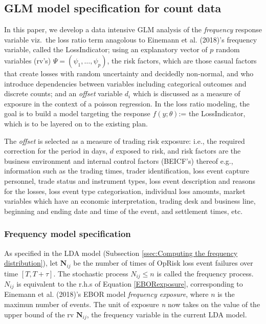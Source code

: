 \documentclass{DissertateUSU}
\begin{document}
\subsection{GLM model specification for count data}
\label{ssec:GLM model specification for count data}

In this paper, we develop a data intensive GLM analysis of the
\emph{frequency} response variable viz.~the loss ratio term anagolous to
Einemann et al. (2018)'s frequency variable, called the LossIndicator;
using an explanatory vector of \(p\) random variables (rv's)
\(\Psi = (\psi_1,\ldots,\psi_p)\), the risk factors, which are those
casual factors that create losses with random uncertainty and decidedly
non-normal, and who introduce dependencies between variables including
categorical outcomes and discrete counts; and an \emph{offset} variable
\(d_i\) which is discussed as a measure of exposure in the context of a
poisson regression. In the loss ratio modeling, the goal is to build a
model targeting the response \(f(y;\theta)\):= the LossIndicator, which
is to be layered on to the existing plan.\medskip

The \emph{offset} is selected as a measure of trading risk exposure:
i.e., the required correction for the period in days, \(d\) exposed to
risk, and risk factors are the business environment and internal control
factors (BEICF's) thereof e.g., information such as the trading times,
trader identification, loss event capture personnel, trade status and
instrument types, loss event description and reasons for the losses,
loss event type categorisation, individual loss amounts, market
variables which have an economic interpretation, trading desk and
business line, beginning and ending date and time of the event, and
settlement times, etc.

\subsubsection{Frequency model specification}
\label{sssec:Frequency model specification}

As specified in the LDA model (Subsection
\ref{ssec:Computing the frequency distribution}), let
\(\mathbf{N}_{ij}\) be the number of times of OpRisk loss event failures
over time \([T,T+\tau]\). The stochastic process \(N_{ij}\leq n\) is
called the frequency process. \(N_{ij}\) is equivalent to the r.h.s of
Equation \ref{EBORexposure}, corresponding to Einemann et al. (2018)'s
EBOR model \emph{frequency exposure}, where \(n\) is the maximun number
of events. The unit of exposure \emph{n} now takes on the value of the
upper bound of the rv \(\mathbf{N}_{ij}\), the frequency variable in the
current LDA model.
\end{document}
